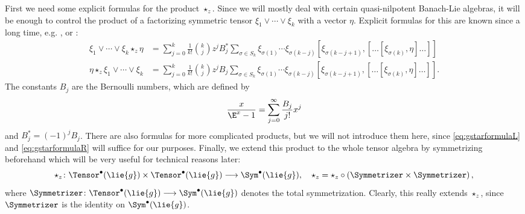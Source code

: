 \documentclass[
11pt,                          %
english                        %
]{article}
\begin{document}
First we need some explicit formulas for the product $\star_z$. Since we will 
mostly deal with certain quasi-nilpotent Banach-Lie algebras, it will be enough to 
control the product of a factorizing symmetric tensor $\xi_1 \vee \cdots \vee \xi_k$ 
with a vector $\eta$. Explicit formulas for this are known since a long time, e.g. 
\cite[Prop. 1]{gutt:1983a}, \cite[2.8.12 (c)]{dixmier:1977a} or \cite[Prop. 2.6]
{esposito.stapor.waldmann:2015a:pre}:
\begin{align}
    \label{eq:gstarformulaR}
    \xi_1 \vee \cdots \vee \xi_k \star_z \eta
    &=
    \sum\limits_{j=0}^k
    \frac{1}{k!} \binom{k}{j}
    z^j B_j^*
    \sum\limits_{\sigma \in S_k}
    \xi_{\sigma(1)} \cdots \xi_{\sigma(k - j)}
    [\xi_{\sigma(k - j + 1)},
    [ \ldots [\xi_{\sigma(k)}, \eta] \ldots ]
    ]
    \\
    \label{eq:gstarformulaL}
    \eta \star_z \xi_1 \vee \cdots \vee \xi_k
    &=
    \sum\limits_{j=0}^k
    \frac{1}{k!} \binom{k}{j}
    z^j B_j
    \sum\limits_{\sigma \in S_k}
    \xi_{\sigma(1)} \cdots \xi_{\sigma(k - j)}
    [\xi_{\sigma(k - j + 1)},
    [ \ldots [\xi_{\sigma(k)}, \eta] \ldots ]
    ]
    .    
\end{align}
The constants $B_j$ are the Bernoulli numbers, which are defined by
\begin{equation}
	\frac{x}{\E^x - 1}
	=
	\sum\limits_{j=0}^\infty
	\frac{B_j}{j!}
	x^j
\end{equation}
and $B_j^* = (-1)^j B_j$. There are also formulas for more complicated products, but 
we will not introduce them here, since \eqref{eq:gstarformulaL} and 
\eqref{eq:gstarformulaR} will suffice for our purposes. Finally, we extend this 
product to the whole tensor algebra by symmetrizing beforehand which will be very 
useful for technical reasons later:
\begin{equation}
	\label{eq:extended-gstar}
	\star_z
	\colon
	\Tensor^{\bullet}(\lie{g})
	\times
	\Tensor^{\bullet}(\lie{g})
	\longrightarrow
	\Sym^{\bullet}(\lie{g})
	, \quad
	\star_z
	=
	\star_z
	\circ
	\left(
		\Symmetrizer \times \Symmetrizer
	\right),
\end{equation}
where $\Symmetrizer \colon \Tensor^{\bullet}(\lie{g}) \longrightarrow \Sym^{\bullet}
(\lie{g})$ denotes the total symmetrization. Clearly, this really extends $\star_z$, 
since $\Symmetrizer$ is the identity on $\Sym^{\bullet}(\lie{g})$. 
\end{document}
